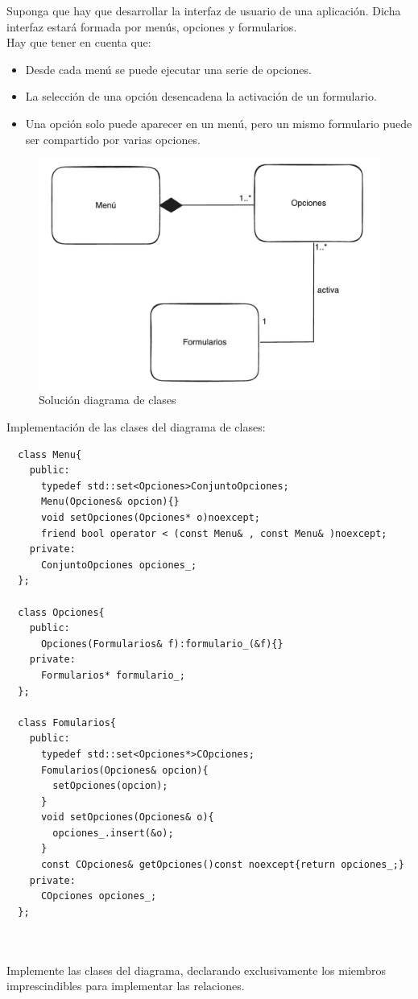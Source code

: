  Suponga que hay que desarrollar la interfaz de usuario de una aplicación. Dicha interfaz estará formada por menús, opciones y formularios.\\ Hay que tener en cuenta que:

\begin{itemize}
  \item Desde cada menú se puede ejecutar una serie de opciones.
  \item La selección de una opción desencadena la activación de un formulario.
  \item Una opción solo puede aparecer en un menú, pero un mismo formulario puede ser compartido por varias opciones.
\end{itemize}

\begin{figure}[h]
  \begin{center}
    \includegraphics[width=\textwidth]{assets/Seminario3_1_1.png}
  \end{center}  
  \caption{Solución diagrama de clases }
\end{figure}

Implementación de las clases del diagrama de clases:
\begin{verbatim}
  class Menu{
    public: 
      typedef std::set<Opciones>ConjuntoOpciones;
      Menu(Opciones& opcion){}
      void setOpciones(Opciones* o)noexcept;
      friend bool operator < (const Menu& , const Menu& )noexcept;
    private:
      ConjuntoOpciones opciones_;
  };

  class Opciones{
    public:
      Opciones(Formularios& f):formulario_(&f){}
    private:
      Formularios* formulario_;
  };

  class Fomularios{
    public:
      typedef std::set<Opciones*>COpciones;
      Fomularios(Opciones& opcion){
        setOpciones(opcion);
      }
      void setOpciones(Opciones& o){
        opciones_.insert(&o);
      }
      const COpciones& getOpciones()const noexcept{return opciones_;}
    private:
      COpciones opciones_;
  };

  
\end{verbatim}
 Implemente las clases del diagrama, declarando exclusivamente los miembros imprescindibles para implementar las relaciones.

